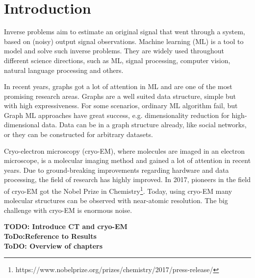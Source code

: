 \chapter{Introduction}
\label{sec:introduction}

Inverse problems aim to estimate an original signal that went through a system, 
based on (noisy) output signal observations.
Machine learning (ML) is a tool to model and solve such inverse problems.
They are widely used throughout different science directions, such as ML,
signal processing, computer vision, natural language processing and others.

In recent years, graphs got a lot of attention in ML and are one of the most promising research areas.
Graphs are a well suited data structure, simple but with high expressiveness. 
For some scenarios, ordinary ML algorithm fail, but Graph ML approaches have great success, e.g. dimensionality reduction for high-dimensional data.
Data can be in a graph structure already, like social networks, or they can be constructed for arbitrary datasets.

Cryo-electron microscopy (cryo-EM), where molecules are imaged in an electron microscope,
is a molecular imaging method and gained a lot of attention in recent years. 
Due to ground-breaking improvements regarding hardware and data processing, the field of research
has highly improved. In 2017, pioneers in the field of cryo-EM got the 
Nobel Prize in Chemistry\footnote{https://www.nobelprize.org/prizes/chemistry/2017/press-release/}.
Today, using cryo-EM many molecular structures can be observed with near-atomic resolution.
The big challenge with cryo-EM is enormous noise.

\bigskip

\textbf{TODO: Introduce CT and cryo-EM} \\

\textbf{ToDo:Reference to Results} \\

\textbf{ToDO: Overview of chapters} \\







